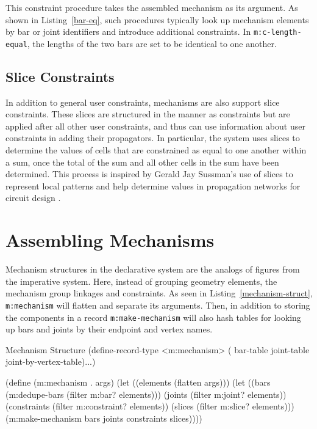 This constraint procedure takes the assembled mechanism as its
argument. As shown in Listing~\ref{bar-eq}, such procedures
typically look up mechanism elements by bar or joint identifiers and
introduce additional constraints. In \texttt{m:c-length-equal}, the
lengths of the two bars are set to be identical to one another.

\subsection{Slice Constraints}

In addition to general user constraints, mechanisms are also support
slice constraints. These slices are structured in the manner as
constraints but are applied after all other user constraints, and thus
can use information about user constraints in adding their
propagators. In particular, the system uses slices to determine the
values of cells that are constrained as equal to one another within a
sum, once the total of the sum and all other cells in the sum have
been determined. This process is inspired by Gerald Jay Sussman's use
of slices to represent local patterns and help determine values in
propagation networks for circuit design \cite{gjs-slices}.

\section{Assembling Mechanisms}
\enlargethispage*{\baselineskip}

Mechanism structures in the declarative system are the analogs of
figures from the imperative system.  Here, instead of grouping
geometry elements, the mechanism group linkages and constraints. As
seen in Listing~\ref{mechanism-struct}, \texttt{m:mechanism} will
flatten and separate its arguments. Then, in addition to storing the
components in a record \texttt{m:make-mechanism} will also hash tables
for looking up bars and joints by their endpoint and vertex names.

\begin{code-listing}
[label=mechanism-struct]
{Mechanism Structure}
(define-record-type <m:mechanism>
    (%
                        bar-table joint-table joint-by-vertex-table)...)

(define (m:mechanism . args)
  (let ((elements (flatten args)))
    (let ((bars (m:dedupe-bars (filter m:bar? elements)))
          (joints (filter m:joint? elements))
          (constraints (filter m:constraint? elements))
          (slices (filter m:slice? elements)))
      (m:make-mechanism bars joints constraints slices))))
\end{code-listing}

